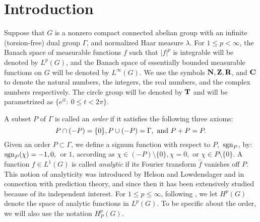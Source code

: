 \section{Introduction}
\newtheorem{equiv-jensen}{Lemma}[section]
Suppose that $G$ is a nonzero compact connected abelian group
with an infinite (torsion-free) dual group $\Gamma$, and
normalized Haar measure $\lambda$.
For $1\leq p<\infty$, the Banach
space of measurable functions $f$ such that
$|f|^p$ is integrable will be denoted by $L^p(G)$,
and the Banach space of essentially bounded measurable functions
on $G$ will be denoted by $L^\infty(G)$.
We 
use the symbols $\N, \Z, \R$, and $\C$ 
to denote the natural numbers, the integers, 
 the real numbers, and the complex numbers respectively.  
The circle group will be denoted by $\T$ and will be 
parametrized as $\{ e^{i t}:\ 0\leq t<2 \pi\}$.

A subset $P$ of $\Gamma$ is called an {\em order}
 if
it satisfies the following three axioms:
$$P\cap (-P)=\{0\}, P\cup (-P)=\Gamma,\ {\rm and}\ P+P=P.$$
Given an order $P\subset \Gamma$, 
we define a signum function
with respect to $P$,\ ${\rm sgn}_P$, by:
${\rm sgn}_P(\chi)=-1,0,$\ or $1$, according as
$\chi\in (-P)\setminus\{0\}, \chi=0$,\ or
$\chi\in P\setminus \{0\}$.  
A function $f\in L^1(G)$
is called {\em analytic}
 if its Fourier transform $\widehat{f}$
vanishes off $P$.  This notion of analyticity 
was introduced by Helson and Lowdenslager \cite{hl1} and
\cite{hl2} in connection with prediction theory,
and since then it has been extensively studied
because of its independent interest.  
For $1\leq p\leq \infty$, following
\cite{hl2}, we let $H^p(G)$ 
denote
the space of analytic functions in $L^p(G)$.
To be specific about the order, we will also use the 
notation $H^p_P(G)$.

